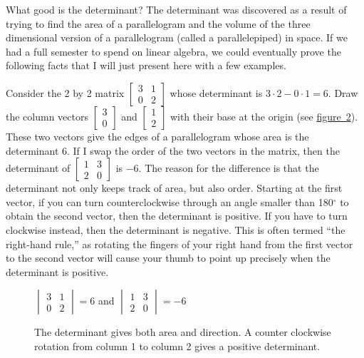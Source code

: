 \documentclass[10pt,]{book}
\theoremstyle{plain}
\theoremstyle{definition}
\theoremstyle{definition}
\theoremstyle{definition}
\theoremstyle{definition}
\theoremstyle{definition}
\numberwithin{equation}{section}
\newcommand{\amp}{&}
\begin{document}
What good is the determinant? The determinant was discovered as a result of trying to find the area of a parallelogram and the volume of the three dimensional version of a parallelogram (called a parallelepiped) in space. If we had a full semester to spend on linear algebra, we could eventually prove the following facts that I will just present here with a few examples.%
\par
Consider the 2 by 2 matrix \(\begin{bmatrix}3\amp 1\\0\amp 2
\end{bmatrix}\) whose determinant is \(3\cdot 2-0\cdot 1=6\). Draw the column vectors \(\begin{bmatrix}3\\0
\end{bmatrix}\) and \(\begin{bmatrix}1\\2
\end{bmatrix}\) with their base at the origin (see \hyperref[detfig]{figure~2}). These two vectors give the edges of a parallelogram whose area is the determinant \(6\). If I swap the order of the two vectors in the matrix, then the determinant of \(\begin{bmatrix}1\amp 3\\2\amp 0
\end{bmatrix}\) is \(-6\). The reason for the difference is that the determinant not only keeps track of area, but also order. Starting at the first vector, if you can turn counterclockwise through an angle smaller than 180\(^\circ\) to obtain the second vector, then the determinant is positive. If you have to turn clockwise instead, then the determinant is negative. This is often termed ``the right-hand rule,'' as rotating the fingers of your right hand from the first vector to the second vector will cause your thumb to point up precisely when the determinant is positive.%
\begin{figure}
\centering
{
\vspace{2pt}
$\begin{vmatrix}{3}\amp {1}\\{0}\amp {2}\end{vmatrix}=6$ and $\begin{vmatrix}{1}\amp {3}\\{2}\amp 0\end{vmatrix}=-6$
}
\caption{The determinant gives both area and direction. A counter clockwise rotation from column 1 to column 2 gives a positive determinant.\label{detfig}}
\end{figure}
\end{document}
